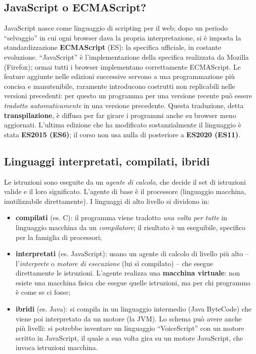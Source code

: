 \subsection{JavaScript o ECMAScript?}
JavaScript nasce come linguaggio di scripting per il web; dopo un periodo ``selvaggio'' in
cui ogni browser dava la propria interpretazione, si \`e imposta la standardizzazione
\textbf{ECMAScript} (ES): la specifica ufficiale, in costante evoluzione. ``JavaScript'' \`e
l'implementazione della specifica realizzata da Mozilla (Firefox); ormai tutti i browser
implementano correttamente ECMAScript. Le feature aggiunte nelle edizioni successive servono a
una programmazione pi\`u concisa e manutenibile, raramente introducono costrutti non
replicabili nelle versioni precedenti: per questo un programma per una versione recente pu\`o
essere \emph{tradotto automaticamente} in una versione precedente. Questa traduzione, detta
\textbf{transpilazione}, \`e diffusa per far girare i programmi anche su browser meno
aggiornati. L'ultima edizione che ha modificato sostanzialmente il linguaggio \`e stata
\textbf{ES2015 (ES6)}; il corso non usa nulla di posteriore a \textbf{ES2020 (ES11)}.

\subsection{Linguaggi interpretati, compilati, ibridi}
Le istruzioni sono eseguite da un \emph{agente di calcolo}, che decide il set di istruzioni
valide e il loro significato. L'agente di base \`e il processore (linguaggio macchina,
inutilizzabile direttamente). I linguaggi di alto livello si dividono in:
\begin{itemize}
  \item \textbf{compilati} (es. C): il programma viene tradotto \emph{una volta per tutte} in
        linguaggio macchina da un \emph{compilatore}; il risultato \`e un eseguibile,
        specifico per la famiglia di processori;
  \item \textbf{interpretati} (es. JavaScript): usano un agente di calcolo di livello pi\`u
        alto -- l'\emph{interprete} o \emph{motore di esecuzione} (lui s\`i compilato) -- che
        esegue direttamente le istruzioni. L'agente realizza una \textbf{macchina virtuale}:
        non esiste una macchina fisica che esegue quelle istruzioni, ma per chi programma \`e
        come se ci fosse;
  \item \textbf{ibridi} (es. Java): si compila in un linguaggio intermedio (Java ByteCode)
        che viene poi interpretato da un motore (la JVM). Lo schema pu\`o avere anche pi\`u
        livelli: si potrebbe inventare un linguaggio ``VoiceScript'' con un motore scritto in
        JavaScript, il quale a sua volta gira su un motore JavaScript, che invoca istruzioni
        macchina.
\end{itemize}

